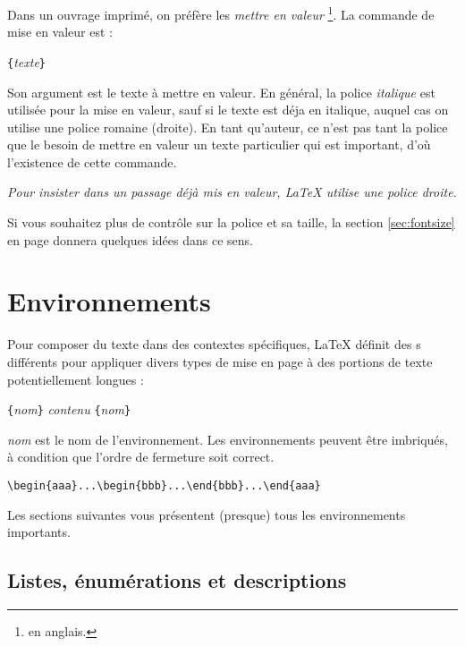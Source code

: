 Dans un ouvrage
imprimé, on préfère les \emph{mettre en valeur}%
\footnote{ en anglais.}.
La commande de mise en valeur est :
\begin{lscommand}
\verb|{|\emph{texte}\verb|}|
\end{lscommand}

Son argument est le texte à mettre en valeur. En général, la police
\emph{italique} est utilisée pour la mise en valeur, sauf si le texte
est déja en italique, auquel cas on utilise une police romaine (droite).
En tant qu'auteur, ce n'est pas tant la police que le besoin de mettre
en valeur un texte particulier qui est important, d'où l'existence de
cette commande.

\begin{example}
\emph{Pour \emph{insister}
dans un passage déjà
mis en valeur, \LaTeX{}
utilise une police droite.}
\end{example}

Si vous souhaitez plus de contrôle sur la police et sa taille, la
section \ref{sec:fontsize} en page \pageref{sec:fontsize} donnera
quelques idées dans ce sens.

\section{Environnements} \label{env}

Pour composer du texte dans des contextes spécifiques, \LaTeX{}
définit des s différents pour appliquer divers types
de mise en page à des portions de texte potentiellement longues :

\begin{lscommand}
\verb|{|\emph{nom}\verb|}|\quad
   \emph{contenu}\quad
{}\verb|{|\emph{nom}\verb|}|
\end{lscommand}
\noindent
\emph{nom} est le nom de l'environnement. Les environnements peuvent
être imbriqués, à condition que l'ordre de fermeture soit correct.
\begin{code}
\verb|\begin{aaa}...\begin{bbb}...\end{bbb}...\end{aaa}|
\end{code}
\noindent Les sections suivantes vous présentent (presque) tous les
environnements importants.

\subsection{Listes, énumérations et descriptions}

